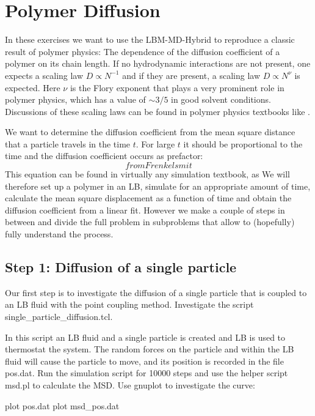 \chapter{Polymer Diffusion}
In these exercises we want to use the LBM-MD-Hybrid to reproduce a classic
result of polymer physics: The dependence of the diffusion coefficient
of a polymer on its chain length. If no hydrodynamic interactions
are not present, one expects a scaling law $D \propto N^{-1}$ and if 
they are present, a scaling law $D \propto N^{\nu}$ is expected. 
Here $\nu$ is the Flory exponent that plays a very prominent role
in polymer physics, which has a value of $\sim 3/5$ in good solvent
conditions. Discussions of these scaling laws can be found
in polymer physics textbooks like \cite{degennes, doi, rubinstein}.


We want to determine the diffusion coefficient from the mean square
distance that a particle travels in the time $t$. For large $t$ it should
be proportional to the time and the diffusion coefficient occurs as 
prefactor: 
\begin{equation}
  from Frenkelsmit
  \label{eq:msd}
\end{equation}
This equation can be found in virtually any simulation textbook, as 
\cite{frenkel}
We will therefore set up a polymer in an LB, simulate for an appropriate
amount of time, calculate the mean square displacement as a function of
time and obtain the diffusion coefficient from a linear fit. However
we make a couple of steps in between and divide the full problem in 
subproblems that allow to (hopefully) fully understand the process.

\section{Step 1: Diffusion of a single particle}
Our first step is to investigate the diffusion of a single particle
that is coupled to an LB fluid with the point coupling method.
Investigate the script single_particle_diffusion.tcl.

In this script an LB fluid and a single particle is created and LB is
used to thermostat the system. The random forces on the particle and
within the LB fluid will cause the particle to move, and its position
is recorded in the file pos.dat. Run the simulation script for 10000 steps
and use the helper script msd.pl to calculate the MSD. Use gnuplot
to investigate the curve:

plot pos.dat
plot msd_pos.dat

